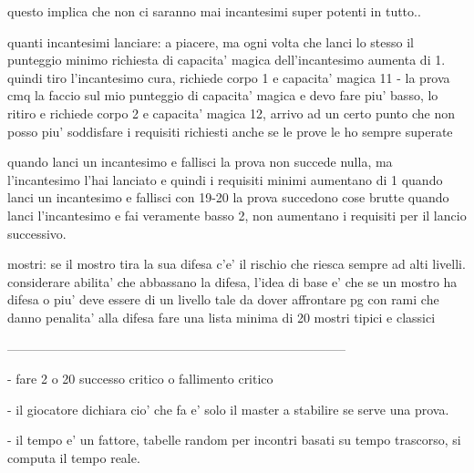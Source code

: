 \documentclass[12pt,a4paper,twoside,openany,twocolumn]{book}
\begin{document}
questo implica che non ci saranno mai incantesimi super potenti in tutto..

quanti incantesimi lanciare:  a piacere, ma ogni volta che lanci lo stesso il punteggio minimo richiesta di capacita' magica dell'incantesimo aumenta di 1. quindi tiro l'incantesimo cura, richiede corpo 1 e capacita' magica 11 - la prova cmq la faccio sul mio punteggio di capacita' magica e devo fare piu' basso, lo ritiro e richiede corpo 2 e capacita' magica 12, arrivo ad un certo punto che non posso piu' soddisfare i requisiti richiesti anche se le prove le ho sempre superate

quando lanci un incantesimo e fallisci la prova non succede nulla, ma l'incantesimo l'hai lanciato e quindi i requisiti minimi aumentano di 1
quando lanci un incantesimo e fallisci con 19-20 la prova succedono cose  brutte
quando lanci l'incantesimo e fai veramente basso 2, non aumentano i requisiti per il lancio successivo.


mostri:
se il mostro tira la sua difesa c'e' il rischio che riesca sempre ad alti livelli. considerare abilita' che abbassano la difesa, l'idea di base e' che se un mostro ha difesa  o piu' deve essere di un livello tale da dover affrontare pg con rami che danno penalita' alla difesa
fare una lista minima di 20 mostri tipici e classici


--------------------------------------------------------------------------------



- fare 2 o 20  successo critico o fallimento  critico

- il giocatore dichiara cio' che fa e' solo il master a stabilire se serve una prova. 

- il tempo e' un fattore, tabelle random per incontri basati su tempo trascorso, si computa il tempo reale.
\end{document}
